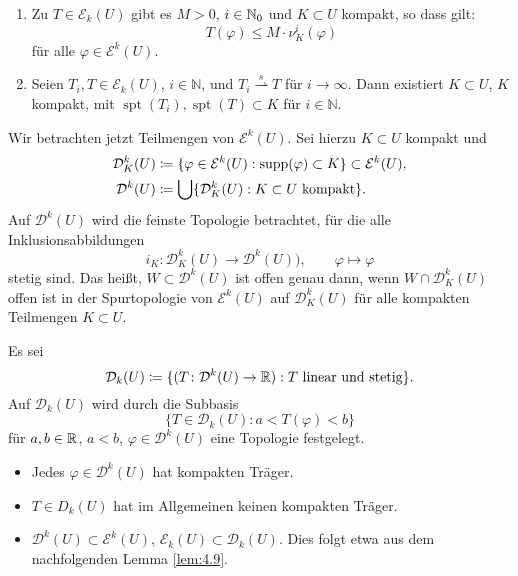 \documentclass[a4paper,twoside,DIV15,BCOR12mm]{scrbook}
\DeclareMathOperator{\supp}{supp}
\DeclareMathOperator{\spt}{spt}
\begin{document}
\begin{lemma}
\label{lem:4.7}
\begin{enumerate}[\quad(a)]
\item Zu $T\in \mathcal E_k(U)$ gibt es $M>0$, $i\in\mathbb{N}_0$ und $K\subset U$ kompakt, so dass gilt:
\[
T(\varphi) \le M \cdot \nu_K^i (\varphi)
\]
für alle $\varphi\in\mathcal E^k(U)$.
\item Seien $T_i, T \in\mathcal E_k(U)$, $i\in\mathbb{N}$, und $T_i \stackrel{s}{\rightharpoonup} T$ für $i\to\infty$. Dann existiert $K\subset U$, $K$ kompakt, mit $\spt(T_i), \spt(T) \subset K$ für $i\in\mathbb{N}$.
\end{enumerate}
\end{lemma}

Wir betrachten jetzt Teilmengen von $\mathcal E^k(U)$. Sei hierzu $K\subset U$ kompakt und
\begin{align*}
\mathcal D_K^k(U) &\da \{\varphi\in\mathcal E^k(U): \supp(\varphi) \subset K\} \subset \mathcal E^k(U), \\
\mathcal D^k(U) &\da \bigcup \{\mathcal D_K^k(U) : K\subset U \text{ kompakt}\}.
\end{align*}
Auf $\mathcal D^k(U)$ wird die feinste Topologie betrachtet, für die alle Inklusionsabbildungen 
$$
i_K\colon \mathcal D_K^k(U) \to \mathcal D^k(U)),\qquad \varphi\mapsto\varphi
$$ 
stetig sind. Das heißt, $W\subset \mathcal D^k(U)$ ist offen genau dann, 
wenn $W\cap \mathcal D_K^k(U)$ offen ist in der Spurtopologie von $\mathcal E^k(U)$ auf $\mathcal D_K^k(U)$ 
für alle kompakten Teilmengen $K\subset U$.

\begin{definition}
Es sei
\[
\mathcal D_k(U) \da \{ (T\colon \mathcal D^k(U) \to \MdR) : \text{$T$ linear und stetig}\}.
\]
Auf $\mathcal D_k(U)$ wird durch die Subbasis
\[
\{T\in \mathcal D_k(U) : a < T(\varphi) < b\}
\]
für $a,b\in\mathbb{R}$, $a<b$, $\varphi\in\mathcal D^k(U)$ eine Topologie festgelegt.
\end{definition}

\begin{bemerkungenX}
\begin{itemize}
\item Jedes $\varphi\in \mathcal D^k(U)$ hat kompakten Träger.
\item $T\in D_k(U)$ hat im Allgemeinen keinen kompakten Träger.
\item $\mathcal D^k(U) \subset \mathcal E^k(U)$, $\mathcal E_k(U) \subset \mathcal D_k(U)$. Dies folgt etwa aus 
dem nachfolgenden Lemma \ref{lem:4.9}.
\end{itemize}
\end{bemerkungenX}
\end{document}
